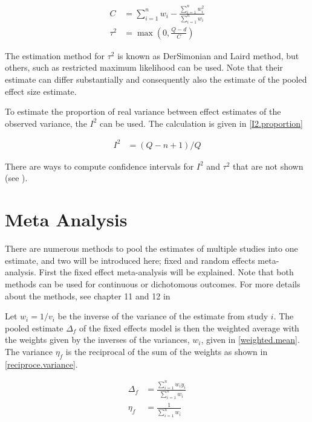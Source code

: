 \documentclass[11pt,a4paper,twoside]{book}\usepackage[]{graphicx}\usepackage[]{color}
\begin{document}
\begin{align}
C &= \sum_{i = 1}^n w_{i} - \frac{\sum_{i = 1}^n w_{i}^2}{\sum_{i = 1}^n w_{i}} \label{C.definition} \\
\tau^2 &= \max(0, \frac{Q - d}{C}) \label{Tau.definition}
\end{align}

The estimation method for $\tau^2$ is known as DerSimonian and Laird method, but others, such as restricted maximum likelihood can be used. Note that their estimate can differ substantially and consequently also the estimate of the pooled effect size estimate.

\vspace{0mm}
To estimate the proportion of real variance between effect estimates of the observed variance, the $I^2$ can be used. The calculation is given in \ref{I2.proportion}

\begin{align}
I^2 &= (Q - n + 1)/Q \label{I2.proportion}
\end{align}

There are ways to compute confidence intervals for $I^2$ and $\tau^2$ that are not shown (see \cite[122]{metaanalysis}).

\section{Meta Analysis}
There are numerous methods to pool the estimates of multiple studies into one estimate, and two will be introduced here; fixed and random effects meta-analysis.
First the fixed effect meta-analysis will be explained. Note that both methods can be used for continuous or dichotomous outcomes. For more details about the methods, see chapter 11 and 12 in \citet{metaanalysis}


\vspace{0mm}
Let $w_i = 1/v_{i}$ be the inverse of the variance of the estimate from study $i$. The pooled estimate $\Delta_{f}$ of the fixed effects model is then the weighted average with the weights given by the inverses of the variances, $w_{i}$, given in \ref{weighted.mean}. The variance $\eta_{f}$ is the reciprocal of the sum of the weights as shown in \ref{reciproce.variance}.

\begin{align}
\Delta_{f} &= \frac{\sum_{i = 1}^n w_{i}y_{i}}{\sum_{i = 1}^n w_{i}} \label{weighted.mean} \\
\eta_{f} &= \frac{1}{\sum_{i = 1}^n w_{i}} \label{reciproce.variance}
\end{align}
\end{document}
